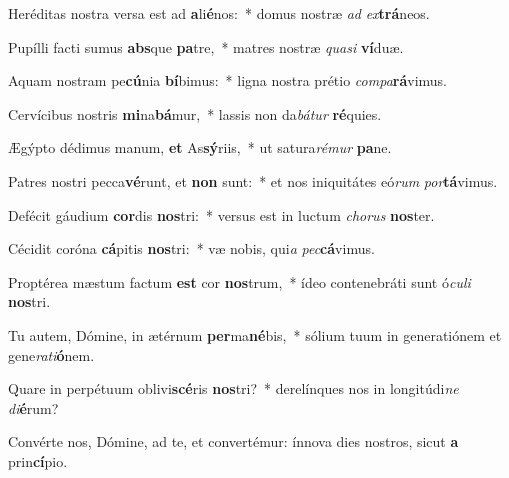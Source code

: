 \item Heréditas nostra versa est ad \textbf{a}li\textbf{é}nos:~* domus nostræ \textit{ad} \textit{ex}\textbf{trá}neos.
\item Pupílli facti sumus \textbf{abs}que \textbf{pa}tre,~* matres nostræ \textit{qua}\textit{si} \textbf{ví}duæ.
\item Aquam nostram pe\textbf{cú}nia \textbf{bí}bimus:~* ligna nostra prétio \textit{com}\textit{pa}\textbf{rá}vimus.
\item Cervícibus nostris \textbf{mi}na\textbf{bá}mur,~* lassis non da\textit{bá}\textit{tur} \textbf{ré}quies.
\item Ægýpto dédimus manum, \textbf{et} As\textbf{sý}riis,~* ut satura\textit{ré}\textit{mur} \textbf{pa}ne.
\item Patres nostri pecca\textbf{vé}runt, et \textbf{non} sunt:~* et nos iniquitátes eó\textit{rum} \textit{por}\textbf{tá}vimus.
\item Defécit gáudium \textbf{cor}dis \textbf{nos}tri:~* versus est in luctum \textit{cho}\textit{rus} \textbf{nos}ter.
\item Cécidit coróna \textbf{cá}pitis \textbf{nos}tri:~* væ nobis, qui\textit{a} \textit{pec}\textbf{cá}vimus.
\item Proptérea mæstum factum \textbf{est} cor \textbf{nos}trum,~* ídeo contenebráti sunt ó\textit{cu}\textit{li} \textbf{nos}tri.
\item Tu autem, Dómine, in ætérnum \textbf{per}ma\textbf{né}bis,~* sólium tuum in generatiónem et gene\textit{ra}\textit{ti}\textbf{ó}nem.
\item Quare in perpétuum oblivi\textbf{scé}ris \textbf{nos}tri?~* derelínques nos in longitúdi\textit{ne} \textit{di}\textbf{é}rum?
\item Convérte nos, Dómine, ad te, et convertémur: ínnova dies nostros, sicut \textbf{a} prin\textbf{cí}pio.
